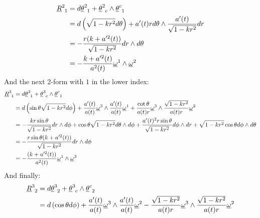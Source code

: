 \documentclass[12pt,a4]{article}
\begin{document}
\begin{enumerate}
    \begin{align*}
      \tensor{\underline{R}}{^2_1} &= d \tensor{\underline{\theta}}{^2_1} + \tensor{\underline{\theta}}{^2_c} \wedge \tensor{\underline{\theta}}{^c_1}\\
                                   &= d\left(\sqrt{1 - k r^2} d\theta \right) + a'(t)r d\theta \wedge \frac{a'(t)}{\sqrt{1 - k r^2}} dr \\
                                   &= - \frac{r(k + a'^2(t))}{\sqrt{1 - k r^2}} d r \wedge d\theta\\
                                   &= -\frac{k + a'^2(t)}{a^2(t)} \underline{\omega}^1 \wedge \underline{\omega}^2
    \end{align*}
    And the next 2-form with $1$ in the lower index:
    \begin{align*}
      \tensor{\underline{R}}{^3_1} &= d \tensor{\underline{\theta}}{^3_1} + \tensor{\underline{\theta}}{^3_c} \wedge \tensor{\underline{\theta}}{^c_1}\\
                                   &= d\left(\sin \theta \sqrt{1 - k r^2}  d\phi\right) + \frac{a'(t)}{a(t)} \underline{\omega}^3 \wedge \frac{a'(t)}{a(t)} \underline{\omega}^1 + \frac{\cot \theta }{a(t)r} \underline{\omega}^3 \wedge \frac{\sqrt{1 - k r^2}}{a(t)r} \underline{\omega}^2\\
                                   &= - \frac{k r\sin \theta }{\sqrt{1 - k r^2}} d r \wedge d \phi + \cos \theta \sqrt{1 - k r^2} d\theta \wedge d \phi + \frac{a'(t)^2 r \sin \theta }{\sqrt{1 - k r^2}}  d \phi \wedge  d r + \sqrt{1 - k r^2}  \cos \theta d\phi  \wedge d\theta\\
                                   &= - \frac{r\sin \theta (k + a'^2(t))}{\sqrt{1 - k r^2}} d r \wedge d \phi \\
                                   &= -\frac{(k + a'^2(t))}{a^2(t)} \underline{\omega}^1 \wedge \underline{\omega}^3
    \end{align*}
    And finally:
    \begin{align*}
      \tensor{\underline{R}}{^3_2} &= d \tensor{\underline{\theta}}{^3_2} + \tensor{\underline{\theta}}{^3_c} \wedge \tensor{\underline{\theta}}{^c_2}\\
                                   &= d\left(\cos \theta d\phi \right) + \frac{a'(t)}{a(t)} \underline{\omega}^3 \wedge \frac{a'(t)}{a(t)} \underline{\omega}^2 - \frac{\sqrt{1 - k r^2}}{a(t) r} \underline{\omega}^3 \wedge \frac{\sqrt{1 - k r^2}}{a(t)r} \underline{\omega}^2 \\

\end{align*}
\end{enumerate}
\end{document}
